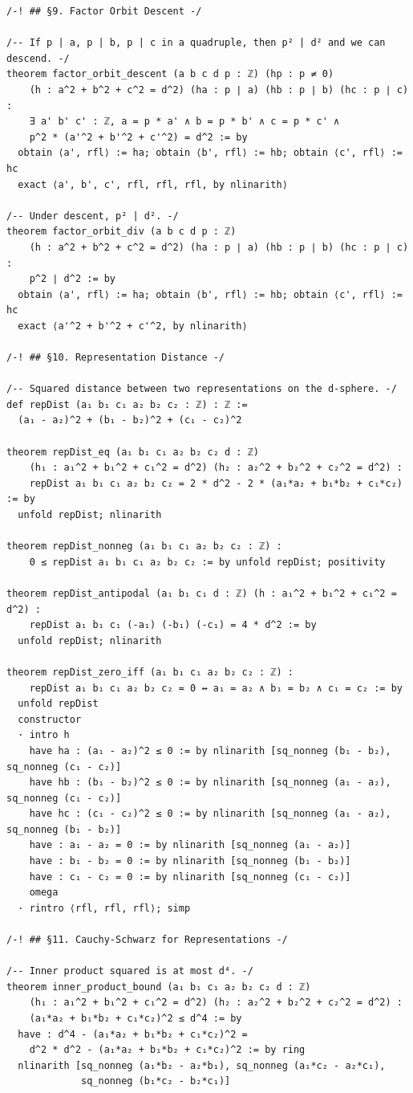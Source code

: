 \documentclass[11pt,openany]{book}
\theoremstyle{definition}
\theoremstyle{plain}
\theoremstyle{remark}
\begin{document}
\begin{lstlisting}[style=lean]
/-! ## §9. Factor Orbit Descent -/

/-- If p | a, p | b, p | c in a quadruple, then p² | d² and we can descend. -/
theorem factor_orbit_descent (a b c d p : ℤ) (hp : p ≠ 0)
    (h : a^2 + b^2 + c^2 = d^2) (ha : p ∣ a) (hb : p ∣ b) (hc : p ∣ c) :
    ∃ a' b' c' : ℤ, a = p * a' ∧ b = p * b' ∧ c = p * c' ∧
    p^2 * (a'^2 + b'^2 + c'^2) = d^2 := by
  obtain ⟨a', rfl⟩ := ha; obtain ⟨b', rfl⟩ := hb; obtain ⟨c', rfl⟩ := hc
  exact ⟨a', b', c', rfl, rfl, rfl, by nlinarith⟩

/-- Under descent, p² | d². -/
theorem factor_orbit_div (a b c d p : ℤ)
    (h : a^2 + b^2 + c^2 = d^2) (ha : p ∣ a) (hb : p ∣ b) (hc : p ∣ c) :
    p^2 ∣ d^2 := by
  obtain ⟨a', rfl⟩ := ha; obtain ⟨b', rfl⟩ := hb; obtain ⟨c', rfl⟩ := hc
  exact ⟨a'^2 + b'^2 + c'^2, by nlinarith⟩

/-! ## §10. Representation Distance -/

/-- Squared distance between two representations on the d-sphere. -/
def repDist (a₁ b₁ c₁ a₂ b₂ c₂ : ℤ) : ℤ :=
  (a₁ - a₂)^2 + (b₁ - b₂)^2 + (c₁ - c₂)^2

theorem repDist_eq (a₁ b₁ c₁ a₂ b₂ c₂ d : ℤ)
    (h₁ : a₁^2 + b₁^2 + c₁^2 = d^2) (h₂ : a₂^2 + b₂^2 + c₂^2 = d^2) :
    repDist a₁ b₁ c₁ a₂ b₂ c₂ = 2 * d^2 - 2 * (a₁*a₂ + b₁*b₂ + c₁*c₂) := by
  unfold repDist; nlinarith

theorem repDist_nonneg (a₁ b₁ c₁ a₂ b₂ c₂ : ℤ) :
    0 ≤ repDist a₁ b₁ c₁ a₂ b₂ c₂ := by unfold repDist; positivity

theorem repDist_antipodal (a₁ b₁ c₁ d : ℤ) (h : a₁^2 + b₁^2 + c₁^2 = d^2) :
    repDist a₁ b₁ c₁ (-a₁) (-b₁) (-c₁) = 4 * d^2 := by
  unfold repDist; nlinarith

theorem repDist_zero_iff (a₁ b₁ c₁ a₂ b₂ c₂ : ℤ) :
    repDist a₁ b₁ c₁ a₂ b₂ c₂ = 0 ↔ a₁ = a₂ ∧ b₁ = b₂ ∧ c₁ = c₂ := by
  unfold repDist
  constructor
  · intro h
    have ha : (a₁ - a₂)^2 ≤ 0 := by nlinarith [sq_nonneg (b₁ - b₂), sq_nonneg (c₁ - c₂)]
    have hb : (b₁ - b₂)^2 ≤ 0 := by nlinarith [sq_nonneg (a₁ - a₂), sq_nonneg (c₁ - c₂)]
    have hc : (c₁ - c₂)^2 ≤ 0 := by nlinarith [sq_nonneg (a₁ - a₂), sq_nonneg (b₁ - b₂)]
    have : a₁ - a₂ = 0 := by nlinarith [sq_nonneg (a₁ - a₂)]
    have : b₁ - b₂ = 0 := by nlinarith [sq_nonneg (b₁ - b₂)]
    have : c₁ - c₂ = 0 := by nlinarith [sq_nonneg (c₁ - c₂)]
    omega
  · rintro ⟨rfl, rfl, rfl⟩; simp

/-! ## §11. Cauchy-Schwarz for Representations -/

/-- Inner product squared is at most d⁴. -/
theorem inner_product_bound (a₁ b₁ c₁ a₂ b₂ c₂ d : ℤ)
    (h₁ : a₁^2 + b₁^2 + c₁^2 = d^2) (h₂ : a₂^2 + b₂^2 + c₂^2 = d^2) :
    (a₁*a₂ + b₁*b₂ + c₁*c₂)^2 ≤ d^4 := by
  have : d^4 - (a₁*a₂ + b₁*b₂ + c₁*c₂)^2 =
    d^2 * d^2 - (a₁*a₂ + b₁*b₂ + c₁*c₂)^2 := by ring
  nlinarith [sq_nonneg (a₁*b₂ - a₂*b₁), sq_nonneg (a₁*c₂ - a₂*c₁),
             sq_nonneg (b₁*c₂ - b₂*c₁)]


\end{lstlisting}
\end{document}
